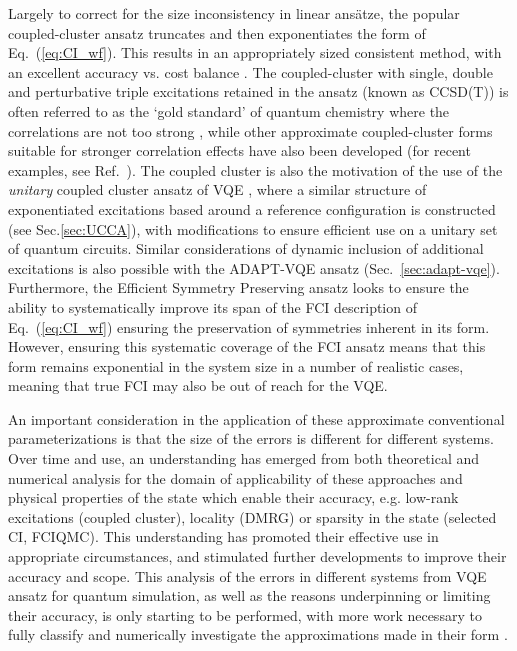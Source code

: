 Largely to correct for the size inconsistency in linear ans\"atze, the popular coupled-cluster ansatz truncates and then exponentiates the form of Eq.~(\ref{eq:CI_wf}). This results in an appropriately sized consistent method, with an excellent accuracy vs. cost balance \cite{Eriksen2016_I, Eriksen2016_II, Ying2019}. The coupled-cluster with single, double and perturbative triple excitations retained in the ansatz (known as CCSD(T)) is often referred to as the `gold standard' of quantum chemistry where the correlations are not too strong \cite{Bartlett2007}, while other approximate coupled-cluster forms suitable for stronger correlation effects have also been developed (for recent examples, see Ref.~\cite{Wang2020_BCCC, Lyakh2011}). The coupled cluster is also the motivation of the use of the {\em unitary} coupled cluster ansatz of VQE \cite{Evangelista2019}, where a similar structure of exponentiated excitations based around a reference configuration is constructed (see Sec.\ref{sec:UCCA}), with modifications to ensure efficient use on a unitary set of quantum circuits. Similar considerations of dynamic inclusion of additional excitations is also possible with the ADAPT-VQE ansatz \cite{Grimsley2019} (Sec.~\ref{sec:adapt-vqe}). Furthermore, the Efficient Symmetry Preserving ansatz \cite{Gard2020} looks to ensure the ability to systematically improve its span of the FCI description of Eq.~(\ref{eq:CI_wf}) ensuring the preservation of symmetries inherent in its form. However, ensuring this systematic coverage of the FCI ansatz means that this form remains exponential in the system size in a number of realistic cases, meaning that true FCI may also be out of reach for the VQE.

An important consideration in the application of these approximate conventional parameterizations is that the size of the errors is different for different systems. Over time and use, an understanding has emerged from both theoretical and numerical analysis for the domain of applicability of these approaches and physical properties of the state which enable their accuracy, e.g. low-rank excitations (coupled cluster), locality (DMRG) or sparsity in the state (selected CI, FCIQMC). This understanding has promoted their effective use in appropriate circumstances, and stimulated further developments to improve their accuracy and scope. This analysis of the errors in different systems from VQE ansatz for quantum simulation, as well as the reasons underpinning or limiting their accuracy, is only starting to be performed, with more work necessary to fully classify and numerically investigate the approximations made in their form \cite{Evangelista2019, Grimsley2019_UCC_Review}.

